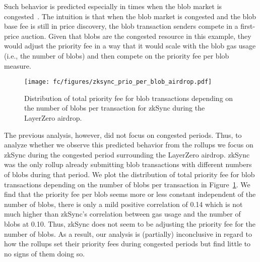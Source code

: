 Such behavior is predicted especially in times when the blob market is congested~\parencite{buterin2024multidimensional,dataalways2024minimumblobfees}. The intuition is that when the blob market is congested and the blob base fee is still in price discovery, the blob transaction senders compete in a first-price auction. Given that blobs are the congested resource in this example, they would adjust the priority fee in a way that it would scale with the blob gas usage (i.e., the number of blobs) and then compete on the priority fee per blob measure. 

\begin{figure}[H]%
\centering
    \texttt{[image: fc/figures/zksync\_prio\_per\_blob\_airdrop.pdf]}
  \caption{Distribution of total priority fee for blob transactions depending on the number of blobs per transaction for zkSync during the LayerZero airdrop.}\label{fig:zksync_prio_per_blob_airdrop}
\end{figure}

The previous analysis, however, did not focus on congested periods. Thus, to analyze whether we observe this predicted behavior from the rollups we focus on zkSync during the congested period surrounding the LayerZero airdrop. zkSync was the only rollup already submitting blob transactions with different numbers of blobs during that period. We plot the distribution of total priority fee for blob transactions depending on the number of blobs per transaction in Figure~\ref{fig:zksync_prio_per_blob_airdrop}.
We find that the priority fee per blob seems more or less constant independent of the number of blobs, there is only a mild positive correlation of 0.14 which is not much higher than zkSync's correlation between gas usage and the number of blobs at 0.10. Thus, zkSync does not seem to be adjusting the priority fee for the number of blobs. As a result, our analysis is (partially) inconclusive in regard to how the rollups set their priority fees during congested periods but find little to no signs of them doing so. 
